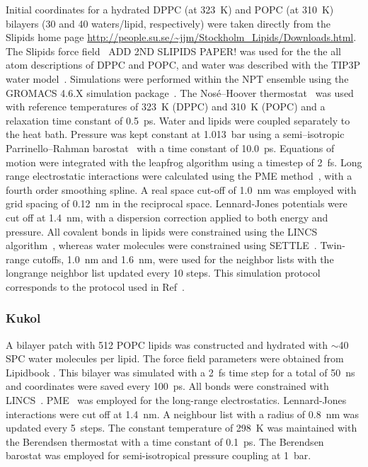 \documentclass[pre,aps,floatfix,authordate1-4,twocolumn]{revtex4-1}
\begin{document}
Initial coordinates for a hydrated DPPC (at 323~K) and POPC (at 310~K) bilayers (30 and 40 waters/lipid, respectively) were taken directly from the Slipids home page \url{http://people.su.se/\~jjm/Stockholm\_Lipids/Downloads.html}.  The Slipids force field~\cite{jambeck12,XXX} ADD 2ND SLIPIDS PAPER! was used for the the all atom descriptions of DPPC and POPC, and
water was described with the TIP3P water model~\cite{jorgensen83}. Simulations were performed within the NPT ensemble using the GROMACS 4.6.X simulation
package~\cite{hess08}. The Nos\'{e}--Hoover thermostat~\cite{nose84,hoover85} was used with reference temperatures of
323~K (DPPC) and 310~K (POPC) and a relaxation time constant of 0.5~ps. Water and lipids were coupled separately to
the heat bath. Pressure was kept constant at 1.013~bar using a semi--isotropic Parrinello--Rahman
barostat~\cite{parrinello81} with a time constant of 10.0~ps. Equations of motion were
integrated with the leapfrog algorithm using a timestep of 2~fs. Long range
electrostatic interactions were calculated using the PME method~\cite{darden93,essman95}, with a fourth order
smoothing spline. A real space cut-off of 1.0~nm was employed with grid spacing of 0.12~nm in the reciprocal space.
Lennard-Jones potentials were cut off at 1.4~nm, with a dispersion correction applied to both energy and pressure. All covalent bonds in lipids were constrained using the LINCS algorithm~\cite{hess97}, 
whereas water molecules were constrained using SETTLE~\cite{miyamoto92}. Twin-range cutoffs,
1.0~nm and 1.6~nm, were used for the neighbor lists with the longrange neighbor list updated every
10 steps. This simulation protocol corresponds to the protocol used in Ref~\cite{jambeck13}. 

\subsubsection{Kukol}
A bilayer patch with 512 POPC lipids was constructed and hydrated with $\sim$40 SPC water molecules per lipid. 
The force field parameters were obtained from Lipidbook \cite{domanski10}.
This bilayer was simulated with a 2~fs time step for a total of 50~ns and coordinates were saved every 100~ps. 
All bonds were constrained with LINCS~\cite{hess97,hess07}. PME~\cite{darden93,essman95} was employed for the long-range electrostatics. Lennard-Jones interactions 
were cut off at 1.4~nm. A neighbour list with a radius of 0.8~nm was updated every 5~steps. The constant temperature of 298~K 
was maintained with the Berendsen thermostat \cite{berendsen84} with a time constant of 0.1~ps. The Berendsen barostat \cite{berendsen84} 
was employed for semi-isotropical pressure coupling at 1~bar.
\end{document}
